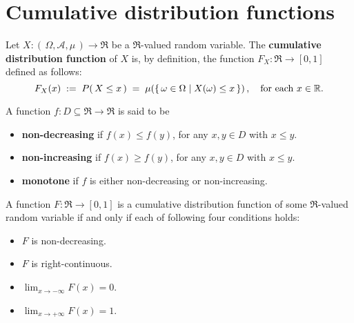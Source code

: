 

\section{Cumulative distribution functions}
\setcounter{theorem}{0}
\setcounter{equation}{0}

\begin{definition}\quad
Let $X : \left(\,\Omega,\mathcal{A},\mu\,\right) \longrightarrow \Re$ be a $\Re$-valued random variable.
The \textbf{cumulative distribution function} of $X$ is, by definition, the function
$F_{X} : \Re \longrightarrow [0,1]$ defined as follows:
\begin{equation*}
F_{X}(x) \; := \; P\!\left(\,X \leq x\,\right) \; = \; \mu\!\left(\left\{\,\omega \in \Omega \;\vert\; X(\omega) \leq x \,\right\}\right),
\quad
\textnormal{for each $x \in \Re$}.
\end{equation*}
\end{definition}

\begin{definition}\quad
A function $f : D \subseteq \Re \longrightarrow \Re$ is said to be 
\begin{itemize}
\item	\textbf{non-decreasing} if $f(x) \leq f(y)$, for any $x, y \in D$ with $x \leq y$.
\item	\textbf{non-increasing} if $f(x) \geq f(y)$, for any $x, y \in D$ with $x \leq y$.
\item	\textbf{monotone} if $f$ is either non-decreasing or non-increasing.
\end{itemize}
\end{definition}

\begin{theorem}\quad
A function $F : \Re \longrightarrow [0,1]$ is a cumulative distribution function of some
$\Re$-valued random variable if and only if each of following four conditions holds:
\begin{itemize}
\item	$F$ is non-decreasing.
\item	$F$ is right-continuous.
\item	$\lim_{x\rightarrow-\infty}F(x) = 0$.
\item	$\lim_{x\rightarrow+\infty}F(x) = 1$.
\end{itemize}
\end{theorem}

